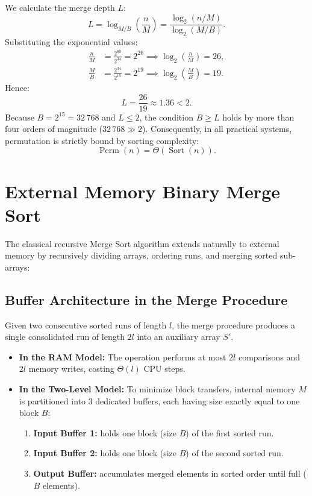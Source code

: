 We calculate the merge depth $L$:
\[
  L = \log_{M/B}\left(\frac{n}{M}\right) = \frac{\log_2(n / M)}{\log_2(M / B)}.
\]
Substituting the exponential values:
\begin{align*}
  \frac{n}{M} &= \frac{2^{60}}{2^{34}} = 2^{26} \implies \log_2\left(\frac{n}{M}\right) = 26, \\
  \frac{M}{B} &= \frac{2^{34}}{2^{15}} = 2^{19} \implies \log_2\left(\frac{M}{B}\right) = 19.
\end{align*}
Hence:
\[
  L = \frac{26}{19} \approx 1.36 < 2.
\]
Because $B = 2^{15} = 32\,768$ and $L \le 2$, the condition $B \ge L$ holds by more than four orders of magnitude ($32\,768 \gg 2$). Consequently, in all practical systems, permutation is strictly bound by sorting complexity:
\[
  \operatorname{Perm}(n) = \Theta(\operatorname{Sort}(n)).
\]

\section{External Memory Binary Merge Sort}
\label{sec:binary-merge-sort}

The classical recursive Merge Sort algorithm extends naturally to external memory by recursively dividing arrays, ordering runs, and merging sorted sub-arrays:

\begin{algorithm}[H]
  \DontPrintSemicolon
  \caption{Binary Merge Sort}
\end{algorithm}

\subsection{Buffer Architecture in the Merge Procedure}
\label{subsec:merge-procedure}

Given two consecutive sorted runs of length $l$, the merge procedure produces a single consolidated run of length $2l$ into an auxiliary array $S'$.

\begin{itemize}
  \item \textbf{In the RAM Model:} The operation performs at most $2l$ comparisons and $2l$ memory writes, costing $\Theta(l)$ CPU steps.
  \item \textbf{In the Two-Level Model:} To minimize block transfers, internal memory $M$ is partitioned into $3$ dedicated buffers, each having size exactly equal to one block $B$:
  \begin{enumerate}
    \item \textbf{Input Buffer 1:} holds one block (size $B$) of the first sorted run.
    \item \textbf{Input Buffer 2:} holds one block (size $B$) of the second sorted run.
    \item \textbf{Output Buffer:} accumulates merged elements in sorted order until full ($B$ elements).
  \end{enumerate}
\end{itemize}

